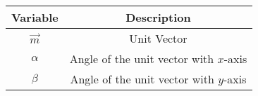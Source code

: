 \begin{tabular}[12pt]{ |c| c|}
    \hline
    \textbf{Variable} & \textbf{Description}\\
    \hline
	$\vec{m}$ & Unit Vector\\
    \hline
	$\alpha$ & Angle of the unit vector with $x$-axis\\
    \hline
	$\beta$ & Angle of the unit vector with $y$-axis\\
    \hline	
    \end{tabular}
